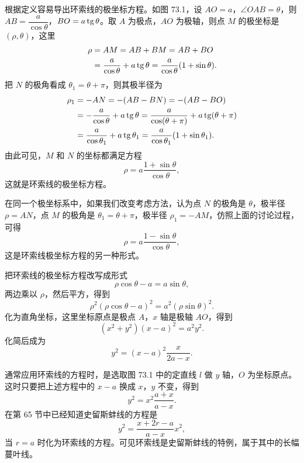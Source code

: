 根据定义容易导出环索线的极坐标方程。如图 73.1，设 $AO=a$，$\angle OAB=\theta$，则 $AB=\dfrac{a}{\cos\theta}$，$BO=a\operatorname{tg}\theta$。取 $A$ 为极点，$AO$ 为极轴，则点 $M$ 的极坐标是 $(\rho,\theta)$，这里
\begin{align*}
  \rho &= AM = AB+BM = AB+BO \\
       &= \frac{a}{\cos\theta} + a\operatorname{tg}\theta = \frac{a}{\cos\theta}(1+\sin\theta).
\end{align*}
把 $N$ 的极角看成 $\theta_1=\theta+\pi$，则其极半径为
\begin{align*}
  \rho_1 &= -AN = -(AB-BN) = -(AB-BO) \\
         &= -\frac{a}{\cos\theta} + a\operatorname{tg}\theta = \frac{a}{\cos(\theta+\pi)} + a\operatorname{tg}(\theta+\pi) \\
         &= \frac{a}{\cos\theta_1} + a\operatorname{tg}\theta_1 = \frac{a}{\cos\theta_1}(1+\sin\theta_1).
\end{align*}
由此可见，$M$ 和 $N$ 的坐标都满足方程
\[
  \rho = a\frac{1+\sin\theta}{\cos\theta},
\]
这就是环索线的极坐标方程。

在同一个极坐标系中，如果我们改变考虑方法，认为点 $N$ 的极角是 $\theta$，极半径 $\rho=AN$，点 $M$ 的极角是 $\theta_1=\theta+\pi$，极半径 $\rho_1=-AM$，仿照上面的讨论过程，可得
\[
  \rho = a\frac{1-\sin\theta}{\cos\theta},
\]
这是环索线极坐标方程的另一种形式。

把环索线的极坐标方程改写成形式
\[
  \rho\cos\theta - a = a\sin\theta,
\]
两边乘以 $\rho$，然后平方，得到
\[
  \rho^2(\rho\cos\theta-a)^2 = a^2(\rho\sin\theta)^2.
\]
化为直角坐标，这里坐标原点是极点 $A$，$x$ 轴是极轴 $AO$，得到
\[
  (x^2+y^2)(x-a)^2 = a^2y^2.
\]
化简后成为
\[
  y^2 = (x-a)^2\frac{x}{2a-x}.
\]

通常应用环索线的方程时，是选取图 73.1 中的定直线 $l$ 做 $y$ 轴，$O$ 为坐标原点。这时只要把上述方程中的 $x-a$ 换成 $x$，$y$ 不变，得到
\[
  y^2 = x^2\frac{a+x}{a-x}.
\]
在第 65 节中已经知道史留斯蚌线的方程是
\[
  y^2 = \frac{x+2r-a}{a-x}x^2,
\]
当 $r=a$ 时化为环索线的方程。可见环索线是史留斯蚌线的特例，属于其中的长幅蔓叶线。
